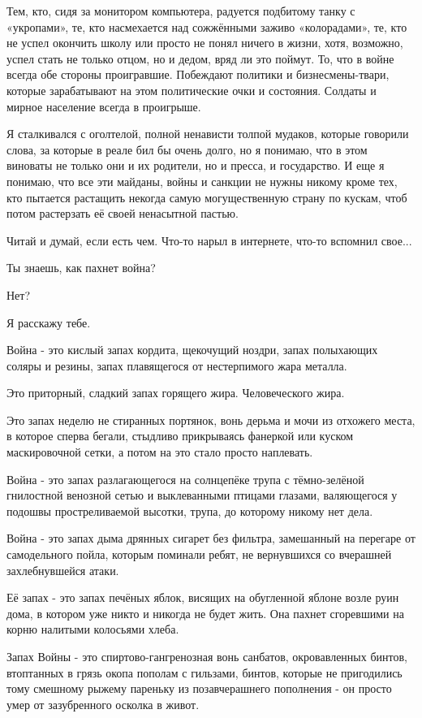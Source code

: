 \documentclass[a4paper,11pt]{extreport}
\begin{document}
Тем, кто, сидя за монитором компьютера, радуется подбитому танку с «укропами»,
те, кто насмехается над сожжёнными заживо «колорадами», те, кто не успел
окончить школу или просто не понял ничего в жизни, хотя, возможно, успел стать
не только отцом, но и дедом, вряд ли это поймут. То, что в войне всегда обе
стороны проигравшие. Побеждают политики и бизнесмены-твари, которые
зарабатывают на этом политические очки и состояния. Солдаты и мирное население
всегда в проигрыше.

Я сталкивался с оголтелой, полной ненависти толпой мудаков, которые говорили
слова, за которые в реале бил бы очень долго, но я понимаю, что в этом виноваты
не только они и их родители, но и пресса, и государство. И еще я понимаю, что
все эти майданы, войны и санкции не нужны никому кроме тех, кто пытается
растащить некогда самую могущественную страну по кускам, чтоб потом растерзать
её своей ненасытной пастью.

Читай и думай, если есть чем. Что-то нарыл в интернете, что-то вспомнил свое...

Ты знаешь, как пахнет война?

Нет?

Я расскажу тебе.

Война - это кислый запах кордита, щекочущий ноздри, запах полыхающих соляры и
резины, запах плавящегося от нестерпимого жара металла.

Это приторный, сладкий запах горящего жира. Человеческого жира.

Это запах неделю не стиранных портянок, вонь дерьма и мочи из отхожего места, в
которое сперва бегали, стыдливо прикрываясь фанеркой или куском маскировочной
сетки, а потом на это стало просто наплевать.

Война - это запах разлагающегося на солнцепёке трупа с тёмно-зелёной гнилостной
венозной сетью и выклеванными птицами глазами, валяющегося у подошвы
простреливаемой высотки, трупа, до которому никому нет дела.

Война - это запах дыма дрянных сигарет без фильтра, замешанный на перегаре от
самодельного пойла, которым поминали ребят, не вернувшихся со вчерашней
захлебнувшейся атаки.

Её запах - это запах печёных яблок, висящих на обугленной яблоне возле руин
дома, в котором уже никто и никогда не будет жить. Она пахнет сгоревшими на
корню налитыми колосьями хлеба.

Запах Войны - это спиртово-гангренозная вонь санбатов, окровавленных бинтов,
втоптанных в грязь окопа пополам с гильзами, бинтов, которые не пригодились
тому смешному рыжему пареньку из позавчерашнего пополнения - он просто умер от
зазубренного осколка в живот.
\end{document}
